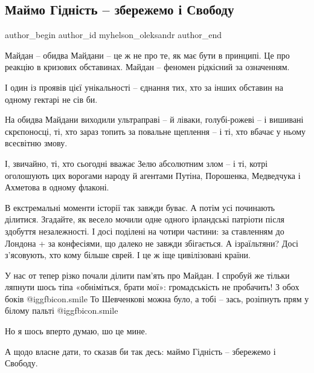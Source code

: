  
 
 
 
 
 
\subsection{Маймо Гідність – збережемо і Свободу}
\label{sec:21_11_2021.fb.myhelson_oleksandr.1.gidnist_svoboda}
 
\ifcmt
 author_begin
   author_id myhelson_oleksandr
 author_end
\fi

Майдан – обидва Майдани – це ж не про те, як має бути в принципі. Це про
реакцію в кризових обставинах. Майдан – феномен рідкісний за означенням. 

І один із проявів цієї унікальності – єднання тих, хто за інших обставин на
одному гектарі не сів би. 

На обидва Майдани виходили ультраправі – й ліваки, голубі-рожеві – і вишивані
скрєпоносці, ті, хто зараз топить за повальне щеплення – і ті, хто вбачає у
ньому всесвітню змову. 

І, звичайно, ті, хто сьогодні вважає Зелю абсолютним злом – і ті, котрі
оголошують цих ворогами народу й агентами Путіна, Порошенка, Медведчука і
Ахметова в одному флаконі.

В екстремальні моменти історії так завжди буває. А потім усі починають
ділитися. Згадайте, як весело мочили одне одного ірландські патріоти після
здобуття незалежності. І досі поділені на чотири частини: за ставленням до
Лондона + за конфесіями, що далеко не завжди збігається. А ізраїльтяни? Досі
з’ясовують, хто кому більше єврей. І це ж іще цивілізовані країни.

У нас от тепер різко почали ділити пам’ять про Майдан. І спробуй же тільки
ляпнути шось тіпа «обніміться, брати мої»: громадськість не пробачить! З обох
боків  @igg{fbicon.smile}  То Шевченкові можна було, а тобі – зась, розіпнуть прям у білому
пальті  @igg{fbicon.smile} 

Но я шось вперто думаю, шо це мине.

А щодо власне дати, то сказав би так десь: маймо Гідність – збережемо і
Свободу.


